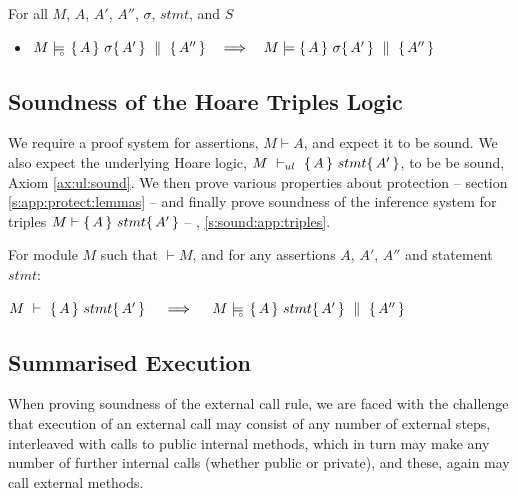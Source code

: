 \begin{lemma}
For all $M$, $A$, $A'$, $A''$, $\sigma$, $stmt$, and $S$
\begin{itemize}
\item
 $M \models\!\!\!\!_{_{\circ}}\   \{\, A \, \}\ \sigma \{\, A' \, \} \, \,\parallel\,\, \{\, A'' \, \}    \ \ \ \Longrightarrow \ \ \   M \models  \{\, A \, \}\ \sigma \{\, A' \, \} \, \,\parallel\,\, \{\, A'' \, \} $

\end{itemize}
\end{lemma}


\subsection{Soundness of the Hoare Triples Logic}
\label{sect:prove:triples:sound}

We require a  proof system for assertions, $M\vdash A$, and expect it to be sound.
We also expect  the    underlying Hoare logic,  $M\ \vdash_{ul}\   \{\, A \, \}\ stmt \{\, A' \, \}$,   to be be  sound, \cf Axiom \ref{ax:ul:sound}.
We then prove various properties about protection -- \cf section \ref{s:app:protect:lemmas} --  and finally prove 
 soundness of the inference system for triples $M \vdash   \{\, A \, \}\ stmt \{\, A' \, \} $ -- \cf \A, \ref{s:sound:app:triples}.

 

\begin{Theorem}
\label{l:triples:sound}
For module  $M$   such that  $\vdash M$, and for any assertions $A$,  $A'$, $A''$ and statement  $stmt$:
\begin{center}
$M\ \vdash\  \triple A {stmt} {A'}  \ \ \ \  \Longrightarrow  \ \ \ \ \satisfiesD {M} {\quadruple {A} {stmt} {A'} {A''}}$
\end{center}
\end{Theorem}
 

\subsection{Summarised Execution}
\label{s:summaized}

When proving soundness of the external call rule, we are faced with the challenge that
execution of an external call may consist of any number of external
steps, interleaved with calls to public internal methods, which in
turn may make any number of further internal calls (whether public or private), and these, again may call external methods.
 


